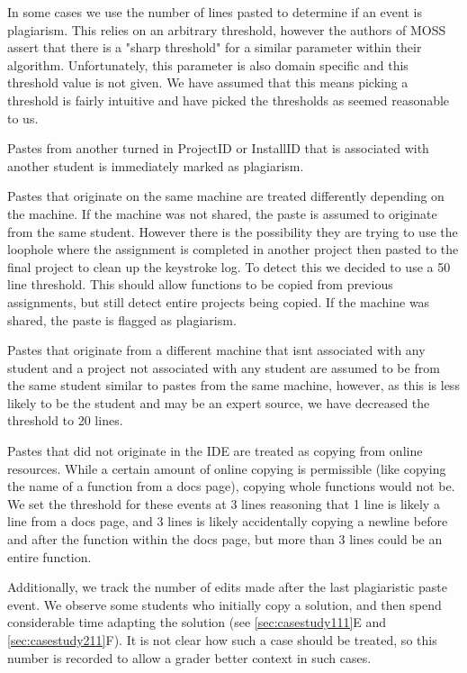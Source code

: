 \documentclass[letterpaper,10pt,conference]{IEEEtran}
\newcommand{\installID}{InstallID\xspace}
\newcommand{\projectID}{ProjectID\xspace}
\begin{document}
In some cases we use the number of lines pasted to determine if an event is plagiarism.  This relies on an arbitrary threshold, however the authors of MOSS assert that there is a "sharp threshold" for a similar parameter within their algorithm\cite{moss}.  Unfortunately, this parameter is also domain specific and this threshold value is not given.  We have assumed that this means picking a threshold is fairly intuitive and have picked the thresholds as seemed reasonable to us.

Pastes from another turned in \projectID or \installID that is associated with another student is immediately marked as plagiarism.  

Pastes that originate on the same machine are treated differently depending on the machine.  If the machine was not shared, the paste is assumed to originate from the same student. However there is the possibility they are trying to use the loophole where the assignment is completed in another project then pasted to the final project to clean up the keystroke log.  To detect this we decided to use a 50 line threshold.  This should allow functions to be copied from previous assignments, but still detect entire projects being copied.   If the machine was shared, the paste is flagged as plagiarism.

Pastes that originate from a different machine that isnt associated with any student and a project not associated with any student are assumed to be from the same student similar to pastes from the same machine, however, as this is less likely to be the student and may be an expert source, we have decreased the threshold to 20 lines. 

Pastes that did not originate in the IDE are treated as copying from online resources.  While a certain amount of online copying is permissible (like copying the name of a function from a docs page), copying whole functions would not be.  We set the threshold for these events at 3 lines reasoning that 1 line is likely a line from a docs page, and 3 lines is likely accidentally copying a newline before and after the function within the docs page, but more than 3 lines could be an entire function.

Additionally, we track the number of edits made after the last plagiaristic paste event.  We observe some students who initially copy a solution, and then spend considerable time adapting the solution (see \ref{sec:casestudy111}E and \ref{sec:casestudy211}F).  It is not clear how such a case should be treated, so this number is recorded to allow a grader better context in such cases.  
\end{document}
